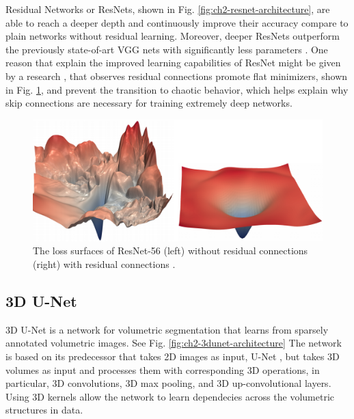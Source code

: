 Residual Networks or ResNets, shown in Fig. \ref{fig:ch2-resnet-architecture}, are able to reach a deeper depth and continuously improve their accuracy compare to plain networks without residual learning. Moreover, deeper ResNets outperform the previously state-of-art VGG nets \cite{Simonyan15vggnets} with significantly less parameters \cite{He2016Resnet}. One reason that explain the improved learning capabilities of ResNet might be given by a research \cite{visualloss}, that observes residual connections promote flat minimizers, shown in Fig. \ref{fig:ch2-resnet-loss}, and prevent the transition to chaotic behavior, which helps explain why skip connections are necessary for training extremely deep networks.

\begin{figure}
	\centering
	\includegraphics[width=0.8\columnwidth]{figures/ch2/resnet-loss.png}
	\caption{The loss surfaces of ResNet-56 (left) without residual connections (right) with residual connections \cite{visualloss}.} 
	\label{fig:ch2-resnet-loss}
\end{figure}
         
\subsection{3D U-Net}
3D U-Net \cite{iek20163Dunet} is a network for volumetric segmentation that learns from sparsely annotated volumetric images. See Fig. \ref{fig:ch2-3dunet-architecture} The network is based on its predecessor that takes 2D images as input, U-Net \cite{2015unet}, but takes 3D volumes as input and processes them with corresponding 3D operations, in particular, 3D convolutions, 3D max pooling, and 3D up-convolutional layers. Using 3D kernels allow the network to learn dependecies across the volumetric structures in data. 

